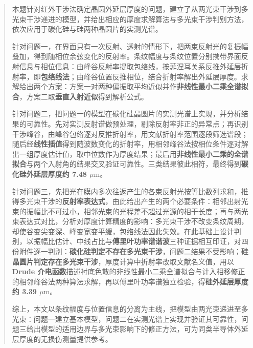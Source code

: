 \begin{abstract}
本题针对红外干涉法确定晶圆外延层厚度的问题，建立了从两光束干涉到多光束干涉递进的模型，并给出相应的厚度求解算法与多光束干涉判别方法，依次应用于碳化硅与硅两种晶圆片的实测光谱。


针对问题一，在界面只有一次反射、透射的情形下，把两束反射光的复振幅叠加，得到随相位余弦变化的反射率。条纹幅度与条纹位置分别携带界面反射信息与相位信息：由峰谷反射率提取包络线，按菲涅耳关系反推外延层折射率，即{\textbf{包络线法}}；由峰谷位置反推相位，结合折射率解出外延层厚度。求解给出两个方案：方案一对两种偏振取平均近似并作{\textbf{非线性最小二乘全谱拟合}}，方案二取{\textbf{垂直入射近似}}得到解析公式。


针对问题二，把问题一的模型在碳化硅晶圆片的实测光谱上实现，并分析结果的可靠性。先对实测反射谱做预处理，剔除反射率非正的异常点；再识别干涉峰谷，由峰谷包络逐对反推折射率，用文献折射率范围逐段筛选谱段；随后经{\textbf{线性插值}}得到随波数变化的折射率，用相邻峰谷法按相位条件逐对解出一组厚度估计值，取中位数作为厚度结果；最后用{\textbf{非线性最小二乘的全谱拟合}}与两个入射角的结果交叉验证可靠性。三类结果彼此相符，最终得到{\textbf{碳化硅外延层厚度约 7.48 $\mu\mathrm{m}$}}。


针对问题三，先把光在膜内多次往返产生的各束反射光按等比数列求和，推得多光束干涉的{\textbf{反射率表达式}}，由此给出产生的两个必要条件：相邻出射光束的振幅比不可过小，相邻光束的光程差不超过光源的相干长度；再与两光束表达式对比，分析对厚度计算精度的影响：多光束干涉不改变条纹周期，却使谷变尖变深、峰变宽变平缓，包络线法因此失效。在此基础上设计判别，以振幅比估计、中线占比与{\textbf{傅里叶功率谱谐波}}三种证据相互印证，对四份附件逐一判别：{\textbf{碳化硅判定不存在多光束干涉}}，问题二结果不受影响；{\textbf{硅晶圆片判定存在多光束干涉}}，厚度计算中折射率改取文献名义值，用以{\textbf{Drude 介电函数}}描述衬底色散的非线性最小二乘全谱拟合与计入相移修正的相邻峰谷法两种算法求解，再以傅里叶功率谱独立检验，得{\textbf{硅外延层厚度约 3.39 $\mu\mathrm{m}$}}。


综上，本文以条纹幅度与位置信息的分离为主线，把模型由两光束递进至多光束：问题一建立基本模型，问题二在实测光谱上实现并验证其可靠性，问题三给出模型的适用边界与多光束影响下的修正方法，可为同类半导体外延层厚度的无损伤测量提供参考。
\end{abstract}
